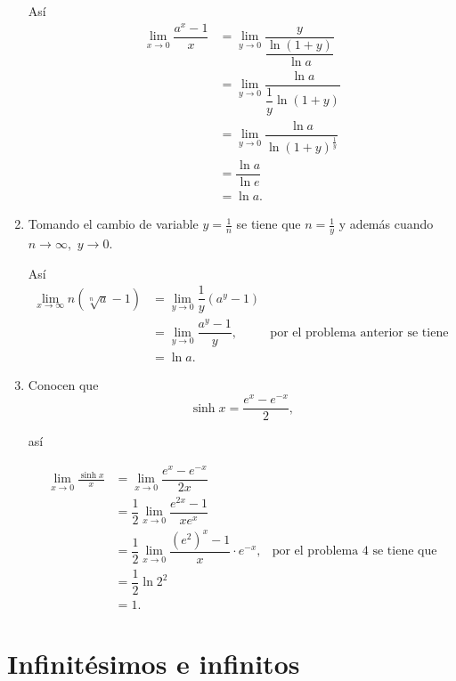 \begin{example}
\begin{enumerate}
		As\'i
		\begin{align*}
		\lim\limits_{x\to 0}\dfrac{a^x-1}{x}&=\lim\limits_{y\to 0}\dfrac{y}{\dfrac{\ln(1+y)}{\ln a}}\\
		&=\lim\limits_{y\to 0}\dfrac{\ln a}{\dfrac{1}{y}\ln(1+y)}\\
		&=\lim\limits_{y\to 0}\dfrac{\ln a}{\ln(1+y)^{\frac{1}{y}}}\\
		&=\dfrac{\ln a}{\ln e}\\
		&=\ln a.
		\end{align*}
		
		\item Tomando el cambio de variable \(y=\frac{1}{n}\) se tiene que \(n=\frac{1}{y}\) y adem\'as cuando \(n\to\infty,\) \(y\to 0.\)\newline
		
		As\'i
		\begin{align*}
		\lim\limits_{x\to \infty}n\left(\sqrt[n]{a}-1\right)&=\lim\limits_{y\to 0}\dfrac{1}{y}\left(a^y-1\right)\\
		&=\lim\limits_{y\to 0}\dfrac{a^y-1}{y},  &\text{por el problema anterior se tiene que}\\
		&=\ln a.
		\end{align*}
		
		\item Conocen que
		\[
		\sinh x=\dfrac{e^x-e^{-x}}{2}	,
		\]
		
		as\'i
		
		\begin{align*}
		\lim\limits_{x\to 0}\frac{\sinh x}{x}&=\lim\limits_{x\to 0}\dfrac{e^x-e^{-x}}{2x}\\
		&=\dfrac{1}{2}\lim\limits_{x\to 0}\dfrac{e^{2x}-1}{xe^x}\\
		&=\dfrac{1}{2}\lim\limits_{x\to 0}\dfrac{\left(e^2\right)^x-1}{x}\cdot e^{-x},&\text{por el problema 4 se tiene que}\\
		&=\dfrac{1}{2}\ln 2^2\\
		&=1.
		\end{align*}
	\end{enumerate}
\end{example}

	
	







\section*{Infinit\'esimos e infinitos}


